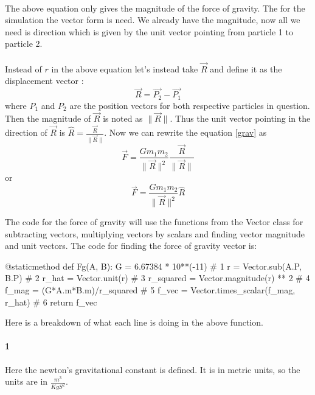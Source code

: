 \documentclass[15pt]{report}
\begin{document}
\paragraph{} The above equation only gives the magnitude of the force of gravity. The for the simulation the vector form is need. We already have the magnitude, now all we need is direction which is given by the unit vector pointing from particle 1 to particle 2. 
\paragraph{} Instead of $r$ in the above equation let's instead take $\vec{R}$ and define it as the displacement vector :
\begin{equation}\label{r_displace}
\vec{R} = \vec{P_2} - \vec{P_1}
\end{equation}
where $P_1$ and $P_2$ are the position vectors for both respective particles in question. Then the magnitude of $\vec{R}$ is noted as $\| \vec{R} \| $. Thus the unit vector pointing in the direction of $\vec{R}$ is $\hat{R} = \frac{\vec{R}}{\| \vec{R} \|}$. Now we can rewrite the equation \ref{grav} as 
\begin{equation}
\vec{F} = \frac{G m_1 m_2}{\| \vec{R} \| ^2}  \frac{\vec{R}}{\| \vec{R} \|}
\end{equation}
or
\begin{equation}
\vec{F} = \frac{G m_1 m_2}{\| \vec{R} \| ^2}  \hat{R}
\end{equation}

The code for the force of gravity will use the functions from the Vector class for subtracting vectors, multiplying vectors by scalars and finding vector magnitude and unit vectors. The code for finding the force of gravity vector is:

\begin{code}
@staticmethod
def Fg(A, B):
	G = 6.67384 * 10**(-11)                     # 1
	r = Vector.sub(A.P, B.P)                    # 2 
 	r_hat = Vector.unit(r)                      # 3 
	r_squared = Vector.magnitude(r) ** 2        # 4 
	f_mag = (G*A.m*B.m)/r_squared               # 5
	f_vec = Vector.times_scalar(f_mag, r_hat)   # 6
	return f_vec

\end{code}

Here is a breakdown of what each line is doing in the above function.
\paragraph{1} Here the newton’s gravitational constant is defined. It is in metric units, so the units are in $\frac{m^3}{KgS^2}$.
\end{document}
